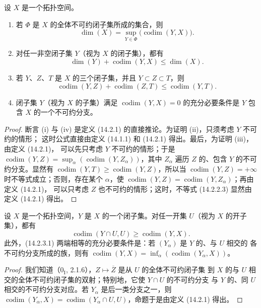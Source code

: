 \begin{proposition}[14.2.2]
\label{0.14.2.2-fr}
设 $X$ 是一个拓扑空间。
\begin{enumerate}
  \item[\rm(i)] 若 $\Phi$ 是 $X$ 的全体不可约闭子集所成的集合，则
  \[
    \dim(X)=\sup_{Y\in\Phi}\bigl(\operatorname{codim}(Y,X)\bigr).
    \tag{14.2.2.1}\label{0.14.2.2.1-fr}
  \]
  \item[\rm(ii)] 对任一非空闭子集 $Y$（视为 $X$ 的闭子集），都有
  \[
    \dim(Y)+\operatorname{codim}(Y,X)\leq\dim(X).
    \tag{14.2.2.2}\label{0.14.2.2.2-fr}
  \]
  \item[\rm(iii)] 若 $Y$、$Z$、$T$ 是 $X$ 的三个闭子集，并且
  $Y\subset Z\subset T$，则
  \[
    \operatorname{codim}(Y,Z)+\operatorname{codim}(Z,T)
    \leq\operatorname{codim}(Y,T).
    \tag{14.2.2.3}\label{0.14.2.2.3-fr}
  \]
  \item[\rm(iv)] 闭子集 $Y$（视为 $X$ 的子集）满足
  $\operatorname{codim}(Y,X)=0$ 的充分必要条件是 $Y$ 包含 $X$ 的一个不可约分支。
\end{enumerate}
\end{proposition}

\begin{proof}
断言 (i) 与 (iv) 是定义 (14.2.1) 的直接推论。为证明 (ii)，只须考虑 $Y$ 不可约的情形；
这时公式直接由定义 (14.1.1) 和 (14.2.1) 得出。最后，为证明 (iii)，由定义 (14.2.1)，
可以先只考虑 $Y$ 不可约的情形；于是
$\operatorname{codim}(Y,Z)=
\sup_\alpha(\operatorname{codim}(Y,Z_\alpha))$，其中 $Z_\alpha$ 遍历 $Z$ 的、包含 $Y$
的不可约分支。显然有
$\operatorname{codim}(Y,T)\geq\operatorname{codim}(Y,Z)$，所以当
$\operatorname{codim}(Y,Z)=+\infty$ 时不等式成立；否则，存在某个 $\alpha$，使
$\operatorname{codim}(Y,Z)=\operatorname{codim}(Y,Z_\alpha)$；再由定义 (14.2.1)，
可以只考虑 $Z$ 也不可约的情形；这时，不等式 (14.2.2.3) 显然由定义 (14.2.1) 得出。
\end{proof}

\begin{proposition}[14.2.3]
\label{0.14.2.3-fr}
设 $X$ 是一个拓扑空间，$Y$ 是 $X$ 的一个闭子集。对任一开集 $U$（视为 $X$ 的开子集），都有
\[
  \operatorname{codim}(Y\cap U,U)\geq\operatorname{codim}(Y,X).
  \tag{14.2.3.1}\label{0.14.2.3.1-fr}
\]
此外，(14.2.3.1) 两端相等的充分必要条件是：若 $(Y_\alpha)$ 是 $Y$ 的、与 $U$ 相交的
各不可约分支所成的族，则有
$\operatorname{codim}(Y,X)=
\inf_\alpha(\operatorname{codim}(Y_\alpha,X))$。
\end{proposition}

\begin{proof}
我们知道（$0_{\mathrm I}$, 2.1.6），$Z\mapsto\overline Z$ 是从 $U$ 的全体不可约闭子集
到 $X$ 的与 $U$ 相交的全体不可约闭子集的双射；特别地，它使 $Y\cap U$ 的不可约分支
与 $Y$ 的、同 $U$ 相交的不可约分支对应。若 $Y_\alpha$ 是后一类分支之一，则
$\operatorname{codim}(Y_\alpha,X)=
\operatorname{codim}(Y_\alpha\cap U,U)$，命题于是由定义 (14.2.1) 得出。
\end{proof}

